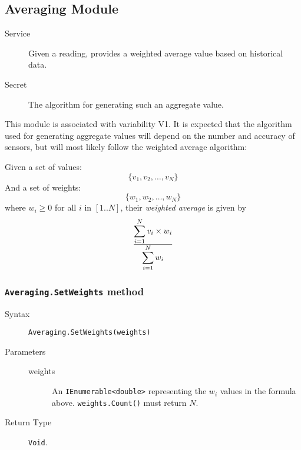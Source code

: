 \documentclass[letterpaper,11pt]{article}
\begin{document}
\subsection{Averaging Module}
\begin{description}
\item[Service] Given a reading, provides a weighted average value based on historical data.
\item[Secret] The algorithm for generating such an aggregate value.
\end{description}

This module is associated with variability V1.  It is expected that the algorithm used for generating aggregate values will depend on the number and accuracy of sensors, but will most likely follow the weighted average algorithm:

Given a set of values:
\begin{displaymath}
  \lbrace v_1, v_2, \ldots, v_N \rbrace
\end{displaymath}
And a set of weights:
\begin{displaymath}
  \lbrace w_1, w_2, \ldots, w_N \rbrace
\end{displaymath}
where $w_i \geq 0$ for all $i$ in $[1..N]$, their \textit{weighted average}
is given by
\begin{displaymath}
  {\displaystyle\sum_{i=1}^N v_i \times w_i}
  \over
  {\displaystyle\sum_{i=1}^N w_i}
\end{displaymath}

\subsubsection{\texttt{Averaging.SetWeights} method}
\begin{description}
\item[Syntax] \texttt{Averaging.SetWeights(weights)}
\item[Parameters] \hfill
  \begin{description}
  \item[weights] An \texttt{IEnumerable<double>} representing the $w_i$ values in the formula above.  \texttt{weights.Count()} must return $N$.
  \end{description}
\item[Return Type] \texttt{Void}.
\end{description}
\end{document}
